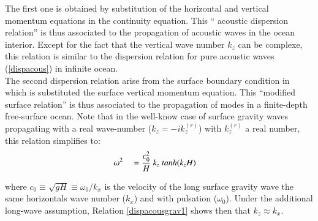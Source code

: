 \documentclass[a4paper,11pt]{article}
\begin{document}
  The first one is obtained by substitution of the horizontal and vertical momentum equations in the continuity equation. This `` acoustic dispersion relation'' is thus associated to the propagation of acoustic waves in the ocean interior. Except for the fact that the vertical wave number $k_z$ can be complexe, this relation is similar to the dispersion relation for pure acoustic waves (\ref{dispacous}) in infinite ocean.\\
  The second dispersion relation arise from the surface boundary condition in which is substituted the surface vertical momentum equation.
  This ``modified surface relation'' is thus associated to the propagation of modes in a finite-depth free-surface ocean. Note that in the well-know case of surface gravity waves propagating with a real wave-number ($k_z=-ik_z^{(r)}$) with $k_z^{(r)}$ a real number, this relation simplifies to:
  \begin{equation}
    \begin{split}
      \displaystyle
      &\omega^2 &&= \frac{c_0^2}{H}\ k_z\ tanh(k_zH)
    \end{split}
  \end{equation}

where $c_0 \equiv \sqrt{gH} \equiv \omega_0 / k_x$ is the velocity of the long surface gravity wave the same horizontals wave number ($k_x$) and with pulsation ($\omega_0$). Under the additional long-wave assumption, Relation \ref{dispacousgrav1} shows then that $k_z \approx k_x$.
\end{document}
